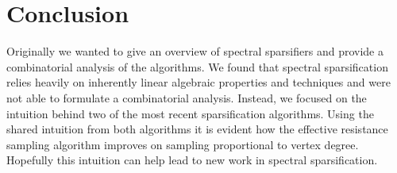 \documentclass[12pt,twoside]{article}
\begin{document}
\section{Conclusion}

Originally we wanted to give an overview of spectral sparsifiers and provide a combinatorial analysis of the algorithms. We found that spectral sparsification relies heavily on inherently linear algebraic properties and techniques and were not able to formulate a combinatorial analysis. Instead, we focused on the intuition behind two of the most recent sparsification algorithms. Using the shared intuition from both algorithms it is evident how the effective resistance sampling algorithm improves on sampling proportional to vertex degree. Hopefully this intuition can help lead to new work in spectral sparsification. 



\end{document}
